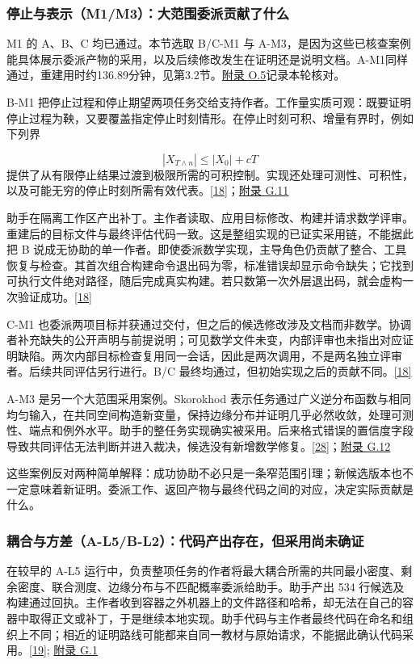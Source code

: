 \subsubsection[停止与表示（M1/M3）：大范围委派贡献了什么]{\texorpdfstring{\protect\hypertarget{r2-4}{}停止与表示（M1/M3）：大范围委派贡献了什么}{停止与表示（M1/M3）：大范围委派贡献了什么}}
M1 的 A、B、C 均已通过。本节选取 B/C-M1 与 A-M3，是因为这些已核查案例能具体展示委派产物的采用，以及后续修改发生在证明还是说明文档。A-M1同样通过，重建用时约136.89分钟，见第3.2节。\href{zh-appendix.pdf\#o5}{附录 O.5}记录本轮核对。

B-M1 把停止过程和停止期望两项任务交给支持作者。工作量实质可观：既要证明停止过程为鞅，又要覆盖指定停止时刻情形。在停止时刻可积、增量有界时，例如下列界

\[
|X_{T\wedge n}|\leq |X_0|+cT
\]
提供了从有限停止结果过渡到极限所需的可积控制。实现还处理可测性、可积性，以及可能无穷的停止时刻所需有效代表。\href{zh.pdf\#ref-18}{\mbox{[18]}}；\href{zh-appendix.pdf\#g11}{附录 G.11}

助手在隔离工作区产出补丁。主作者读取、应用目标修改、构建并请求数学评审。重建后的目标文件与最终评估代码一致。这是整组实现的已证实采用链，不能据此把 B 说成无协助的单一作者。即使委派数学实现，主导角色仍贡献了整合、工具恢复与检查。其首次组合构建命令退出码为零，标准错误却显示命令缺失；它找到可执行文件绝对路径，随后完成真实构建。若只数第一次外层退出码，就会虚构一次验证成功。\href{zh.pdf\#ref-18}{\mbox{[18]}}

C-M1 也委派两项目标并获通过交付，但之后的候选修改涉及文档而非数学。协调者补充缺失的公开声明与前提说明；可见数学文件未变，内部评审也未指出对应证明缺陷。两次内部目标检查复用同一会话，因此是两次调用，不是两名独立评审者。后续共同评估另行进行。B/C 最终均通过，但初始实现之后的贡献不同。\href{zh.pdf\#ref-18}{\mbox{[18]}}

A-M3 是另一个大范围采用案例。Skorokhod 表示任务通过广义逆分布函数与相同均匀输入，在共同空间构造新变量，保持边缘分布并证明几乎必然收敛，处理可测性、端点和例外水平。助手的整任务实现确实被采用。后来格式错误的置信度字段导致共同评估无法判断并进入裁决，候选没有新增数学修复。\href{zh.pdf\#ref-28}{\mbox{[28]}}；\href{zh-appendix.pdf\#g12}{附录 G.12}

这些案例反对两种简单解释：成功协助不必只是一条窄范围引理；新候选版本也不一定意味着新证明。委派工作、返回产物与最终代码之间的对应，决定实际贡献是什么。

\subsubsection[耦合与方差（A-L5/B-L2）：代码产出存在，但采用尚未确证]{\texorpdfstring{\protect\hypertarget{r2-5}{}耦合与方差（A-L5/B-L2）：代码产出存在，但采用尚未确证}{耦合与方差（A-L5/B-L2）：代码产出存在，但采用尚未确证}}
在较早的 A-L5 运行中，负责整项任务的作者将最大耦合所需的共同最小密度、剩余密度、联合测度、边缘分布与不匹配概率委派给助手。助手产出 534 行候选及构建通过回执。主作者收到容器之外机器上的文件路径和哈希，却无法在自己的容器中取得正文或补丁，于是继续本地实现。助手代码与主作者最终代码在命名和组织上不同；相近的证明路线可能都来自同一教材与原始请求，不能据此确认代码采用。\href{zh.pdf\#ref-19}{\mbox{[19]}}; \href{zh-appendix.pdf\#g1}{附录 G.1}

